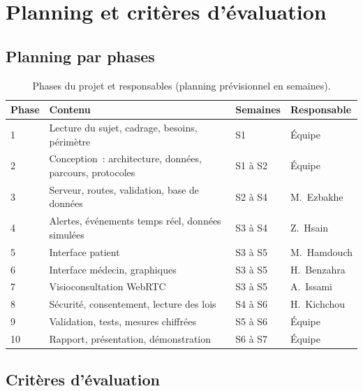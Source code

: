 \chapter{Planning et critères d'évaluation}
\label{ann:planning}

\section{Planning par phases}

\begin{table}[H]
\centering
\caption{Phases du projet et responsables (planning prévisionnel en semaines).}
\label{tab:phases}
\small
\begin{tabularx}{\textwidth}{@{}l X l l@{}}
\toprule
\textbf{Phase} & \textbf{Contenu} & \textbf{Semaines} & \textbf{Responsable} \\
\midrule
1 & Lecture du sujet, cadrage, besoins, périmètre & S1 & Équipe \\
2 & Conception~: architecture, données, parcours, protocoles & S1 à S2 & Équipe \\
3 & Serveur, routes, validation, base de données & S2 à S4 & M.~Ezbakhe \\
4 & Alertes, événements temps réel, données simulées & S3 à S4 & Z.~Hsain \\
5 & Interface patient & S3 à S5 & M.~Hamdouch \\
6 & Interface médecin, graphiques & S3 à S5 & H.~Benzahra \\
7 & Visioconsultation WebRTC & S3 à S5 & A.~Issami \\
8 & Sécurité, consentement, lecture des lois & S4 à S6 & H.~Kichchou \\
9 & Validation, tests, mesures chiffrées & S5 à S6 & Équipe \\
10 & Rapport, présentation, démonstration & S6 à S7 & Équipe \\
\bottomrule
\end{tabularx}
\end{table}

\section{Critères d'évaluation}

